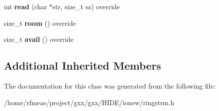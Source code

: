 \begin{DoxyCompactItemize}
\item 
int {\bfseries read} (char $\ast$str, size\+\_\+t sz) override\hypertarget{classgxx_1_1io_1_1ringstrm_a43ab52d8e77d95c132f1b2e5ac1df049}{}\label{classgxx_1_1io_1_1ringstrm_a43ab52d8e77d95c132f1b2e5ac1df049}

\item 
size\+\_\+t {\bfseries room} () override\hypertarget{classgxx_1_1io_1_1ringstrm_a9c9b15c0384aeb64540b943bc1a30cc8}{}\label{classgxx_1_1io_1_1ringstrm_a9c9b15c0384aeb64540b943bc1a30cc8}

\item 
size\+\_\+t {\bfseries avail} () override\hypertarget{classgxx_1_1io_1_1ringstrm_a54386d2cb61dd37fd2aded74ddbfef0d}{}\label{classgxx_1_1io_1_1ringstrm_a54386d2cb61dd37fd2aded74ddbfef0d}

\end{DoxyCompactItemize}
\subsection*{Additional Inherited Members}


The documentation for this class was generated from the following file\+:\begin{DoxyCompactItemize}
\item 
/home/rfmeas/project/gxx/gxx/\+H\+I\+D\+E/ionew/ringstrm.\+h\end{DoxyCompactItemize}
